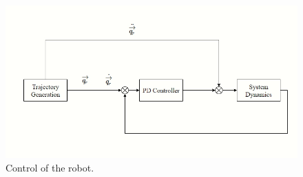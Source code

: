 \documentclass[12pt, a4paper]{report}
\begin{document}
\begin{figure}[h]
	\vspace{1pt}
	\centering
	\includegraphics[scale=0.7]{images/system.jpg} 
	\caption{Control of the robot.}
	\label{fig:blockdiagram}
\end{figure}\par
\end{document}
